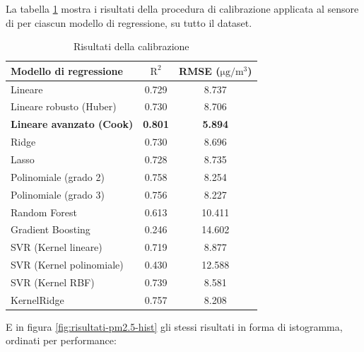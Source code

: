 La tabella \ref{fig:risultati-pm2.5} mostra i risultati della procedura di calibrazione applicata al sensore di  per ciascun modello di regressione, su tutto il dataset.

\begin{table}[H]
    \footnotesize
    \centering
    \begin{tabular}{|l|c|c|}
    \hline
        \textbf{Modello di regressione} & $\bm{\mathrm{R^2}}$ & \textbf{RMSE (}$\mathrm{\si{\micro}g/m^3}$) \\ \hline
        Lineare & 0.729 & 8.737 \\ \hline
        Lineare robusto (Huber) & 0.730 & 8.706 \\ \hline
        \textbf{Lineare avanzato (Cook)} & \textbf{0.801} & \textbf{5.894} \\ \hline
        Ridge & 0.730 & 8.696 \\ \hline
        Lasso & 0.728 & 8.735 \\ \hline
        Polinomiale (grado 2) & 0.758 & 8.254 \\ \hline
        Polinomiale (grado 3) & 0.756 & 8.227 \\ \hline
        Random Forest & 0.613 & 10.411 \\ \hline
        Gradient Boosting & 0.246 & 14.602 \\ \hline
        SVR (Kernel lineare) & 0.719 & 8.877 \\ \hline
        SVR (Kernel polinomiale) & 0.430 & 12.588 \\ \hline
        SVR (Kernel RBF) & 0.739 & 8.581 \\ \hline
        KernelRidge & 0.757 & 8.208 \\ \hline
    \end{tabular}
    \captionsetup{justification=centering}
    \caption{Risultati della calibrazione }
    \label{fig:risultati-pm2.5}
\end{table}

E in figura \ref{fig:risultati-pm2.5-hist} gli stessi risultati in forma di istogramma, ordinati per performance:

